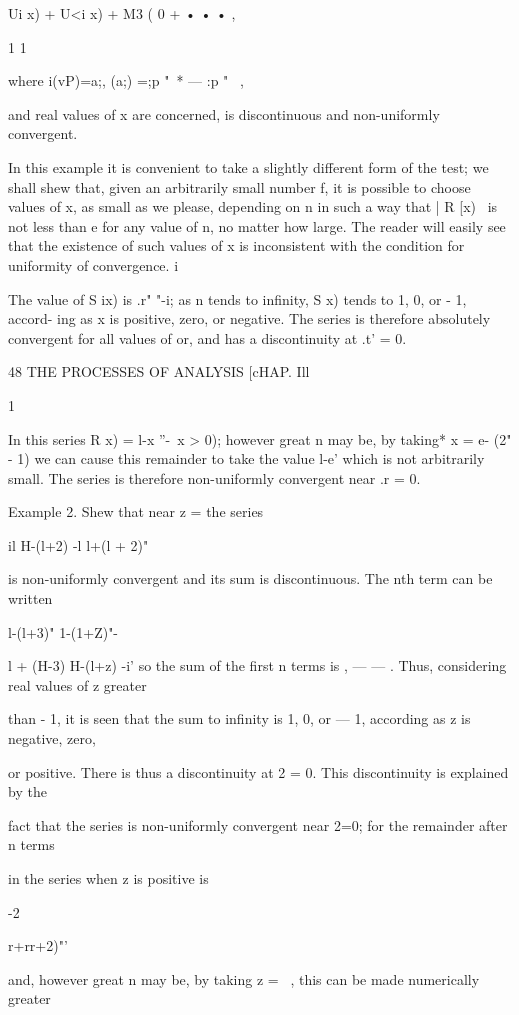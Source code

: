 Ui x) + U<i x) + M3 ( 0 + • • • ,

1 1

where i(vP)=a;, (a;) =;p "~* — :p "~ ,

and real values of x are concerned, is discontinuous and non-uniformly
convergent.

In this example it is convenient to take a slightly different form of
the test; we shall shew that, given an arbitrarily small number f, it
is possible to choose values of x, as small as we please, depending on
n in such a way that | R [x) \ is not less than e for any value of n,
no matter how large. The reader will easily see that the existence of
such values of x is inconsistent with the condition for uniformity of
convergence. i\

The value of S ix) is .r" "-i; as n tends to infinity, S x) tends to
1, 0, or - 1, accord- ing as x is positive, zero, or negative. The
series is therefore absolutely convergent for all values of or, and
has a discontinuity at .t' = 0.



48 THE PROCESSES OF ANALYSIS [cHAP. Ill

1

In this series R x) = l-x ''-\ x > 0); however great n may be, by
taking* x = e- (2" - 1) we can cause this remainder to take the value
l-e' which is not arbitrarily small. The series is therefore
non-uniformly convergent near .r = 0.

Example 2. Shew that near z = the series

 il H-(l+2) -l l+(l + 2)"

is non-uniformly convergent and its sum is discontinuous. The nth term
can be written

l-(l+3)" 1-(1+Z)"-

l + (H-3) H-(l+z) -i' so the sum of the first n terms is , — — . Thus,
considering real values of z greater

than - 1, it is seen that the sum to infinity is 1, 0, or — 1,
according as z is negative, zero,

or positive. There is thus a discontinuity at 2 = 0. This
discontinuity is explained by the

fact that the series is non-uniformly convergent near 2=0; for the
remainder after n terms

in the series when z is positive is

-2

r+rr+2)"'

and, however great n may be, by taking z = ~, this can be made
numerically greater

